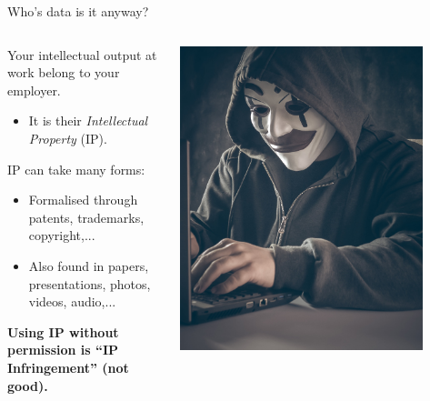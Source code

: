 \begin{frame}{Who's data is it anyway?}

\begin{columns}[c]
    \begin{column}{0.45\textwidth}

    \begin{minipage}[t][.7\textheight]{\textwidth}

    Your intellectual output at work belong to your employer.
    \begin{itemize}
    \item It is their \emph{Intellectual Property} (IP).
    \end{itemize}
    
    \vfill
    
    IP can take many forms:
    \begin{itemize}
        \item Formalised through patents, trademarks, copyright,...
        \item Also found in papers, presentations, photos, videos, audio,...
    \end{itemize}
    
    \vfill
    
    \textbf{Using IP without permission is ``IP Infringement'' (not good).}
    \end{minipage}%
    
    \end{column}

    \begin{column}{0.45\textwidth}
        \includegraphics[width=0.85\textwidth]{images/bermix-studio-F7DAQIDSk98-unsplash.jpg}
    \end{column}


\end{columns}
\end{frame}
